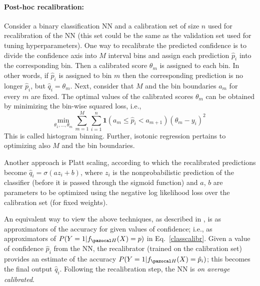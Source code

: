 \paragraph{Post-hoc recalibration:}\label{sec:posthoc}
Consider a binary classification NN and a calibration set of size $n$ used for recalibration of the NN (this set could be the same as the validation set used for tuning hyperparameters).
One way to recalibrate the predicted confidence is to divide the confidence axis into $M$ interval bins and assign each prediction $\hat{p}_i$ into the corresponding bin. 
Then a calibrated score $\theta_m$ is assigned to each bin. 
In other words, if $\hat{p}_i$ is assigned to bin $m$ then the corresponding prediction is no longer $\hat{p}_i$, but $\hat{q}_i=\theta_m$.
Next, consider that $M$ and the bin boundaries $a_m$ for every $m$ are fixed. 
The optimal values of the calibrated scores $\theta_m$ can be obtained by minimizing the bin-wise squared loss, i.e.,
\begin{equation}
\underset{\theta_1,\dots,\theta_m}{\mathrm{min}}~\sum_{m=1}^{M}\sum_{i=1}^{n} \textbf{1}(a_m \leq \hat{p}_i < a_{m+1})(\theta_m-y_i)^2
\end{equation}
This is called histogram binning. 
Further, isotonic regression pertains to optimizing also $M$ and the bin boundaries. 

Another approach is Platt scaling, according to which the recalibrated predictions become $\hat{q}_i=\sigma(az_i+b)$, where $z_i$ is the nonprobabilistic prediction of the classifier (before it is passed through the sigmoid function) and $a$, $b$ are parameters to be optimized using the negative log likelihood loss over the calibration set (for fixed weights).

An equivalent way to view the above techniques, as described in \textcite{kuleshov2018accurate}, is as approximators of the accuracy for given values of confidence; i.e., as approximators of $P(Y = 1 | f_{\cH}(X) = p)$ in Eq.~\eqref{classcalibr}. 
Given a value of confidence $\hat{p}_i$ from the NN, the recalibrator (trained on the calibration set) provides an estimate of the accuracy $P(Y = 1 | f_{\cH}(X) = \hat{p}_i)$; this becomes the final output $\hat{q}_i$. 
Following the recalibration step, the NN is \textit{on average calibrated}.

